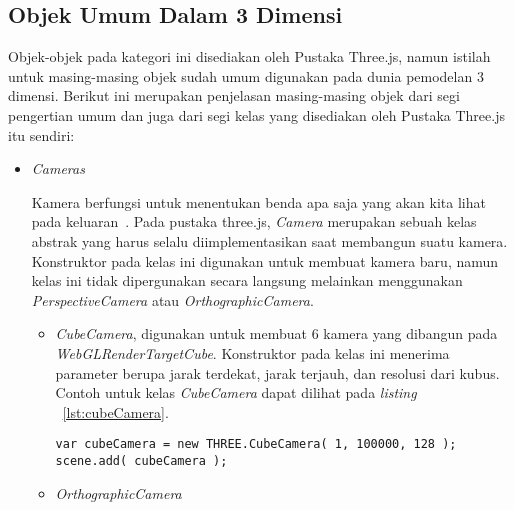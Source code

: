 \subsection{Objek Umum Dalam 3 Dimensi}
\label{sec:objekumum}
Objek-objek pada kategori ini disediakan oleh Pustaka Three.js, namun istilah untuk masing-masing objek sudah umum digunakan pada dunia pemodelan 3 dimensi. Berikut ini merupakan penjelasan masing-masing objek dari segi pengertian umum dan juga dari segi kelas yang disediakan oleh Pustaka Three.js itu sendiri:

\begin{itemize}

	\item \textit{Cameras}

	Kamera berfungsi untuk menentukan benda apa saja yang akan kita lihat pada keluaran~\cite{learningThreejs}. Pada pustaka three.js, {\it Camera} merupakan sebuah kelas abstrak yang harus selalu diimplementasikan saat membangun suatu kamera. Konstruktor pada kelas ini digunakan untuk membuat kamera baru, namun kelas ini tidak dipergunakan secara langsung melainkan menggunakan {\it PerspectiveCamera} atau {\it OrthographicCamera}.

	\begin{itemize}
		\item {\it CubeCamera}, digunakan untuk membuat 6 kamera yang dibangun pada {\it WebGLRenderTargetCube}. Konstruktor pada kelas ini menerima parameter berupa jarak terdekat, jarak terjauh, dan resolusi dari kubus. Contoh untuk kelas {\it CubeCamera} dapat dilihat pada {\it listing} ~\ref{lst:cubeCamera}.
\begin{lstlisting}[caption={Contoh instansiasi kelas {\it CubeCamera}.}, label={lst:cubeCamera},captionpos=b]
var cubeCamera = new THREE.CubeCamera( 1, 100000, 128 );
scene.add( cubeCamera );
\end{lstlisting}
		\item{\it OrthographicCamera}
		

\end{itemize}
\end{itemize}
